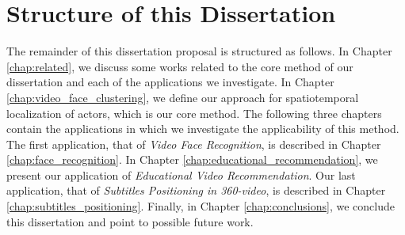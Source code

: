 \section{Structure of this Dissertation}

The remainder of this dissertation proposal is structured as follows. 
In Chapter \ref{chap:related}, we discuss some works related to the core method of our dissertation and each of the applications we investigate.
In Chapter \ref{chap:video_face_clustering}, we define our approach for spatiotemporal localization of actors, which is our core method.
The following three chapters contain the applications in which we investigate the applicability of this method.
The first application, that of \emph{Video Face Recognition}, is described in Chapter \ref{chap:face_recognition}.
In Chapter \ref{chap:educational_recommendation}, we present our application of \emph{Educational Video Recommendation}.
Our last application, that of \emph{Subtitles Positioning in 360-video}, is described in Chapter \ref{chap:subtitles_positioning}. Finally, in Chapter \ref{chap:conclusions}, we conclude this dissertation and point to possible future work.